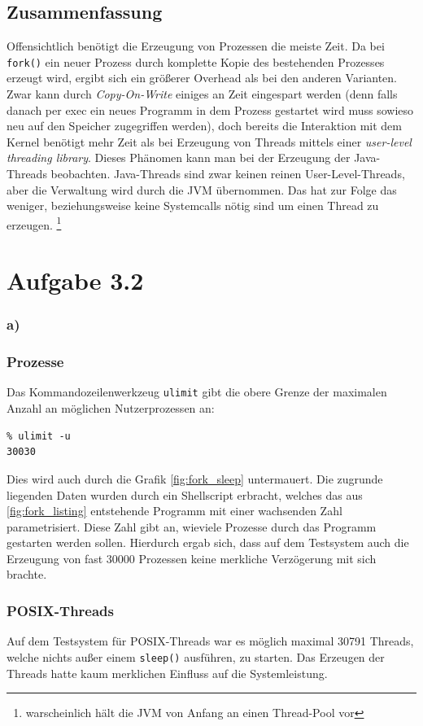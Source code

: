 \documentclass[a4paper,
12pt,
BCOR12mm,
]{scrartcl}
\begin{document}
\subsection*{Zusammenfassung}
Offensichtlich benötigt die Erzeugung von Prozessen die meiste Zeit. Da bei
\verb|fork()| ein neuer Prozess durch komplette Kopie des bestehenden Prozesses
erzeugt wird, ergibt sich ein größerer Overhead als bei den anderen Varianten. Zwar
kann durch \emph{Copy-On-Write} einiges an Zeit eingespart werden (denn falls danach per
exec ein neues Programm in dem Prozess gestartet wird muss sowieso neu auf den Speicher
zugegriffen werden), doch bereits die Interaktion mit dem Kernel benötigt mehr Zeit als
bei Erzeugung von Threads mittels einer \emph{user-level threading library}.
Dieses Phänomen kann man bei der Erzeugung der Java-Threads beobachten. Java-Threads sind
zwar keinen reinen User-Level-Threads, aber die Verwaltung wird durch die JVM übernommen.
Das hat zur Folge das weniger, beziehungsweise keine Systemcalls nötig sind um einen
Thread zu erzeugen. \footnote{warscheinlich hält die JVM von Anfang an einen Thread-Pool vor}

\section*{Aufgabe 3.2} 
\subsubsection*{a)}
\subsubsection*{Prozesse} 
Das Kommandozeilenwerkzeug \verb|ulimit| gibt die obere Grenze der maximalen Anzahl an
möglichen Nutzerprozessen an:
\begin{verbatim} 
% ulimit -u
30030
\end{verbatim}
Dies wird auch durch die Grafik \ref{fig:fork_sleep} untermauert. Die zugrunde liegenden
Daten wurden durch ein Shellscript erbracht, welches das aus \ref{fig:fork_listing}
entstehende Programm mit einer wachsenden Zahl parametrisiert. Diese Zahl gibt an,
wieviele Prozesse durch das Programm gestarten werden sollen. Hierdurch ergab sich, dass
auf dem Testsystem auch die Erzeugung von fast $30000$ Prozessen keine merkliche
Verzögerung mit sich brachte.
\subsubsection*{POSIX-Threads}
Auf dem Testsystem für POSIX-Threads war es möglich maximal 30791 Threads, welche nichts außer einem \verb|sleep()|
ausführen, zu starten. Das Erzeugen der Threads hatte kaum merklichen Einfluss auf die Systemleistung.
\end{document}
